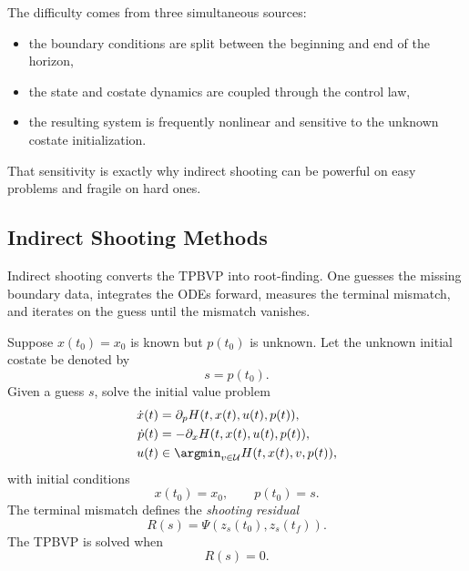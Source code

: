 \begin{remark}
	The difficulty comes from three simultaneous sources:
	\begin{itemize}
		\item the boundary conditions are split between the beginning and end of the horizon,
		\item the state and costate dynamics are coupled through the control law,
		\item the resulting system is frequently nonlinear and sensitive to the unknown costate initialization.
	\end{itemize}
	That sensitivity is exactly why indirect shooting can be powerful on easy problems and fragile on hard ones.
\end{remark}

\subsection{Indirect Shooting Methods}
\label{sec:l5-indirect-shooting-methods}

\begin{intuition}
	Indirect shooting converts the TPBVP into root-finding. One guesses the missing boundary data, integrates the ODEs forward, measures the terminal mismatch, and iterates on the guess until the mismatch vanishes.
\end{intuition}

\begin{definition}\label{def:l5-single-shooting-for-a-tpbvp}
	Suppose $x(t_0)=x_0$ is known but $p(t_0)$ is unknown. Let the unknown initial costate be denoted by
	\[
		s=p(t_0).
	\]
	Given a guess $s$, solve the initial value problem
	\begin{align*}
		\dot x(t) & = \partial_p H(t,x(t),u(t),p(t)), \\
		\dot p(t) & = -\partial_x H(t,x(t),u(t),p(t)), \\
		u(t) & \in \argmin_{v \in \mathcal{U}}H(t,x(t),v,p(t)),
	\end{align*}
	with initial conditions
	\[
		x(t_0)=x_0,
		\qquad
		p(t_0)=s.
	\]
	The terminal mismatch defines the \emph{shooting residual}
	\[
		R(s)=\Psi(z_s(t_0),z_s(t_f)).
	\]
	The TPBVP is solved when
	\[
		R(s)=0.
	\]
\end{definition}

\begin{algorithm}[H]
	\DontPrintSemicolon
	\caption{Indirect Single Shooting}
\label{alg:l5-indirect-single-shooting}
\end{algorithm}

